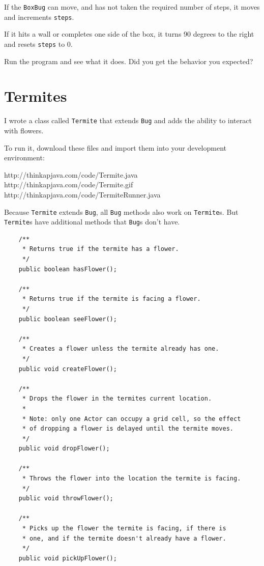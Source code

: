 \documentclass[12pt]{book}
\theoremstyle{exercise}
\begin{document}
If the {\tt BoxBug} can move, and has not taken the required number
of steps, it moves and increments {\tt steps}.

If it hits a wall or completes one side of the box, it turns 90 degrees
to the right and resets {\tt steps} to 0.

Run the program and see what it does.  Did you get the behavior you
expected?


\section{Termites}

I wrote a class called {\tt Termite} that extends {\tt Bug} and adds
the ability to interact with flowers.

To run it, download these files and import them into your development
environment:

\begin{verbatimtab}
http://thinkapjava.com/code/Termite.java
http://thinkapjava.com/code/Termite.gif
http://thinkapjava.com/code/TermiteRunner.java
\end{verbatimtab}

Because {\tt Termite} extends {\tt Bug}, all {\tt Bug} methods
also work on {\tt Termite}s.  But {\tt Termite}s have additional
methods that {\tt Bug}s don't have.

\begin{lstlisting}
    /**
     * Returns true if the termite has a flower.
     */
    public boolean hasFlower();

    /**
     * Returns true if the termite is facing a flower.
     */
    public boolean seeFlower();

    /**
     * Creates a flower unless the termite already has one.
     */
    public void createFlower();

    /**
     * Drops the flower in the termites current location.
     *
     * Note: only one Actor can occupy a grid cell, so the effect
     * of dropping a flower is delayed until the termite moves.
     */
    public void dropFlower();

    /**
     * Throws the flower into the location the termite is facing.
     */
    public void throwFlower();

    /**
     * Picks up the flower the termite is facing, if there is
     * one, and if the termite doesn't already have a flower.
     */
    public void pickUpFlower();
\end{lstlisting}
\end{document}
